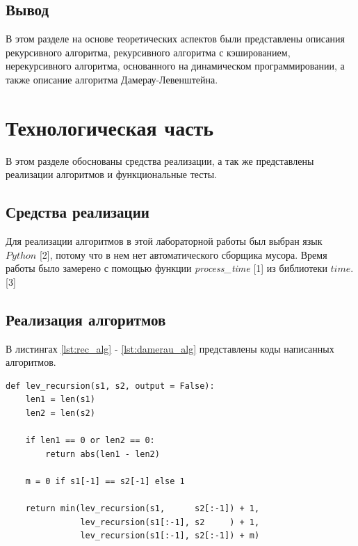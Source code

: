 \documentclass{article}
\begin{document}
\clearpage\subsection{Вывод}
В этом разделе на основе теоретических аспектов были представлены описания рекурсивного алгоритма, рекурсивного 
алгоритма с кэшированием, нерекурсивного алгоритма, основанного на динамическом программировании, а также описание 
алгоритма Дамерау-Левенштейна.


\clearpage\section{Технологическая часть}
В этом разделе обоснованы средства реализации, а так же представлены реализации алгоритмов и функциональные тесты.

\subsection{Средства реализации}
Для реализации алгоритмов в этой лабораторной работы был выбран язык $Python$ [2], потому что в нем нет 
автоматического сборщика мусора. Время работы было замерено с помощью функции
\textit{process\_time} [1] из библиотеки $time$. [3]

\subsection{Реализация алгоритмов}
В листингах \ref{lst:rec_alg} - \ref{lst:damerau_alg} представлены коды написанных алгоритмов.

\begin{lstlisting}[style=python, label=lst:rec_alg,caption=Рекурсивный алгоритм]
def lev_recursion(s1, s2, output = False):
    len1 = len(s1)
    len2 = len(s2)

    if len1 == 0 or len2 == 0:
        return abs(len1 - len2)

    m = 0 if s1[-1] == s2[-1] else 1

    return min(lev_recursion(s1,      s2[:-1]) + 1,
               lev_recursion(s1[:-1], s2     ) + 1,
               lev_recursion(s1[:-1], s2[:-1]) + m)
\end{lstlisting}
\end{document}
